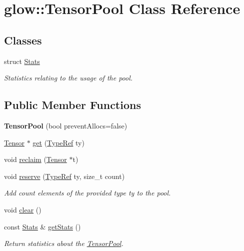 \hypertarget{classglow_1_1_tensor_pool}{}\section{glow\+:\+:Tensor\+Pool Class Reference}
\label{classglow_1_1_tensor_pool}
\subsection*{Classes}
\begin{DoxyCompactItemize}
\item 
struct \hyperlink{structglow_1_1_tensor_pool_1_1_stats}{Stats}
\begin{DoxyCompactList}\small\item\em Statistics relating to the usage of the pool. \end{DoxyCompactList}\end{DoxyCompactItemize}
\subsection*{Public Member Functions}
\begin{DoxyCompactItemize}
\item 
\mbox{\label{classglow_1_1_tensor_pool_a73e3619d284eb51de11ffd449cddbab6}} 
{\bfseries Tensor\+Pool} (bool prevent\+Allocs=false)
\item 
\hyperlink{classglow_1_1_tensor}{Tensor} $\ast$ \hyperlink{classglow_1_1_tensor_pool_acc0ba9e26ed657d789b92dccc3ed0b73}{get} (\hyperlink{structglow_1_1_type}{Type\+Ref} ty)
\item 
void \hyperlink{classglow_1_1_tensor_pool_aca0c52c7f6857d238dbe7873766f5350}{reclaim} (\hyperlink{classglow_1_1_tensor}{Tensor} $\ast$t)
\item 
\mbox{\label{classglow_1_1_tensor_pool_a1bbc6fce7e3f511d149ee741708e4398}} 
void \hyperlink{classglow_1_1_tensor_pool_a1bbc6fce7e3f511d149ee741708e4398}{reserve} (\hyperlink{structglow_1_1_type}{Type\+Ref} ty, size\+\_\+t count)
\begin{DoxyCompactList}\small\item\em Add {\ttfamily count} elements of the provided type {\ttfamily ty} to the pool. \end{DoxyCompactList}\item 
void \hyperlink{classglow_1_1_tensor_pool_a67ae82ff913ef17d2b18cb86182b0546}{clear} ()
\item 
\mbox{\label{classglow_1_1_tensor_pool_a9977cc9788c58efeca73ee43b770d40f}} 
const \hyperlink{structglow_1_1_tensor_pool_1_1_stats}{Stats} \& \hyperlink{classglow_1_1_tensor_pool_a9977cc9788c58efeca73ee43b770d40f}{get\+Stats} ()
\begin{DoxyCompactList}\small\item\em Return statistics about the \hyperlink{classglow_1_1_tensor_pool}{Tensor\+Pool}. \end{DoxyCompactList}\end{DoxyCompactItemize}
